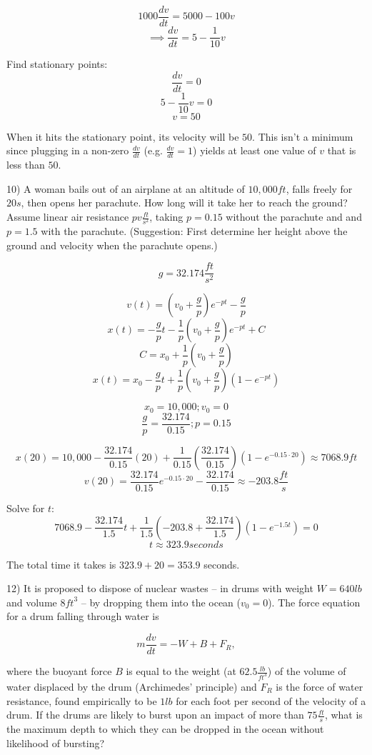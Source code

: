 \documentclass{article}
\begin{document}
\[1000 \frac{dv}{dt} = 5000 - 100v\]
\[\implies \frac{dv}{dt} = 5 - \frac{1}{10}v\]


Find stationary points:
\[\frac{dv}{dt} = 0\]
\[5 - \frac{1}{10}v = 0\]
\[v = 50\]

When it hits the stationary point, its velocity will be $50$.
This isn't a minimum since plugging in a non-zero $\frac{dv}{dt}$
(e.g. $\frac{dv}{dt} = 1$) yields
at least one value of $v$ that is less than $50$. 


10) A woman bails out of an airplane at an altitude of
$10,000 ft$, falls freely for $20 s$, then opens her
parachute. How long will it take her to reach the ground?
Assume linear air resistance $pv \frac{ft}{s^2}$,
taking $p = 0.15$ without the parachute and
and $p = 1.5$ with the parachute. (Suggestion:
First determine her height above the ground and
velocity when the parachute opens.)

\[g = 32.174 \frac{ft}{s^2}\]

\[v(t) = (v_0 + \frac{g}{p})e^{-pt} - \frac{g}{p}\]
\[x(t) = -\frac{g}{p}t - \frac{1}{p}(v_0 + \frac{g}{p})e^{-pt} + C\]
\[C = x_0 + \frac{1}{p}(v_0 + \frac{g}{p})\]
\[x(t) = x_0 - \frac{g}{p}t + \frac{1}{p}(v_0 + \frac{g}{p})(1 - e^{-pt})\]

\[x_0 = 10,000; v_0 = 0\]
\[\frac{g}{p} = \frac{32.174}{0.15}; p = 0.15\]

\[x(20) = 10,000 - \frac{32.174}{0.15}(20) + \frac{1}{0.15}(\frac{32.174}{0.15})(1 - e^{-0.15 \cdot 20}) \approx 7068.9 ft\]
\[v(20) = \frac{32.174}{0.15}e^{-0.15 \cdot 20} - \frac{32.174}{0.15} \approx -203.8 \frac{ft}{s}\]

Solve for $t$:
\[7068.9 - \frac{32.174}{1.5}t + \frac{1}{1.5}(-203.8 + \frac{32.174}{1.5})(1 - e^{-1.5t}) = 0\]
\[t \approx 323.9 seconds\]


The total time it takes is $323.9 + 20 = 353.9$ seconds.


12) It is proposed to dispose of nuclear wastes -- in drums
with weight $W = 640 lb$ and volume $8 {ft}^3$ -- by
dropping them into the ocean ($v_0 = 0$). The force
equation for a drum falling through water is

\[m \frac{dv}{dt} = -W + B + F_R,\]

where the buoyant force $B$ is equal to
the weight (at $62.5 \frac{lb}{{ft}^3}$) of
the volume of water displaced by the drum
(Archimedes' principle) and $F_R$ is the
force of water resistance, found
empirically to be $1 lb$ for each
foot per second of the velocity of
a drum. If the drums are likely
to burst upon an impact of more than
$75 \frac{ft}{s}$, what is the maximum
depth to which they can be dropped in
the ocean without likelihood of bursting?
\end{document}
